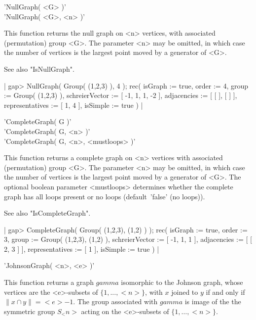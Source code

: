 
'NullGraph( <G> )' \\
'NullGraph( <G>, <n> )'

This function  returns the  null  graph on <n>  vertices, with associated
(permutation) group <G>.  The parameter <n> may be omitted, in which case
the number of vertices is the largest point moved by a generator of <G>.

See also "IsNullGraph".

|    gap> NullGraph( Group( (1,2,3) ), 4 );
    rec(
      isGraph := true,
      order := 4,
      group := Group( (1,2,3) ),
      schreierVector := [ -1, 1, 1, -2 ],
      adjacencies := [ [  ], [  ] ],
      representatives := [ 1, 4 ],
      isSimple := true ) |


'CompleteGraph( G )' \\
'CompleteGraph( G, <n> )' \\
'CompleteGraph( G, <n>, <mustloops> )'

This  function returns a complete graph  on <n> vertices with  associated
(permutation) group <G>. The parameter <n> may be  omitted, in which case
the number of vertices is the largest point moved by a  generator of <G>.
The   optional  boolean  parameter  <mustloops>  determines whether   the
complete graph has all loops present  or no loops (default\:\ 'false' (no
loops)).

See also "IsCompleteGraph".

|    gap> CompleteGraph( Group( (1,2,3), (1,2) ) );
    rec(
      isGraph := true,
      order := 3,
      group := Group( (1,2,3), (1,2) ),
      schreierVector := [ -1, 1, 1 ],
      adjacencies := [ [ 2, 3 ] ],
      representatives := [ 1 ],
      isSimple := true ) |


'JohnsonGraph( <n>, <e> )'

This function  returns a graph  $gamma$ isomorphic to  the Johnson graph,
whose vertices are the <e>-subsets of $\{1,...,<n>\}$, with $x$ joined to
$y$ if  and only if $\|x  \cap y\| = <e>-1$.   The group  associated with
$gamma$  is image  of   the the symmetric   group $S_<n>$  acting  on the
<e>-subsets of $\{1,\ldots,<n>\}$.

